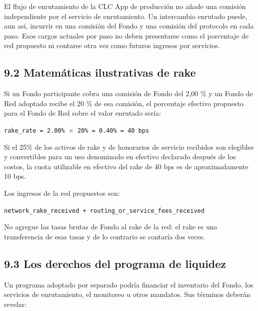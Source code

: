 \documentclass[11pt]{article}
\begin{document}
El flujo de enrutamiento de la CLC App de producción no añade una comisión independiente por el servicio de enrutamiento. Un intercambio enrutado puede, aun así, incurrir en una comisión del Fondo y una comisión del protocolo en cada paso. Esos cargos actuales por paso no deben presentarse como el porcentaje de red propuesto ni contarse otra vez como futuros ingresos por servicios.

\subsection*{9.2 Matemáticas ilustrativas de rake}

Si un Fondo participante cobra una comisión de Fondo del 2,00 \% y un Fondo de Red adoptado recibe el 20 \% de esa comisión, el porcentaje efectivo propuesto para el Fondo de Red sobre el valor enrutado sería:

\texttt{rake\_rate = 2.00\% $\times$ 20\% = 0.40\% = 40 bps}

Si el 25\% de los activos de rake y de honorarios de servicio recibidos son elegibles y convertibles para un uso denominado en efectivo declarado después de los costos, la cuota utilizable en efectivo del rake de 40 bps es de aproximadamente 10 bps.

Los ingresos de la red propuestos son:

\texttt{network\_rake\_received + routing\_or\_service\_fees\_received}

No agregue las tasas brutas de Fondo al rake de la red: el rake es una transferencia de esas tasas y de lo contrario se contaría dos veces.

\subsection*{9.3 Los derechos del programa de liquidez}

Un programa adoptado por separado podría financiar el inventario del Fondo, los servicios de enrutamiento, el monitoreo u otros mandatos. Sus términos deberán revelar:
\end{document}
